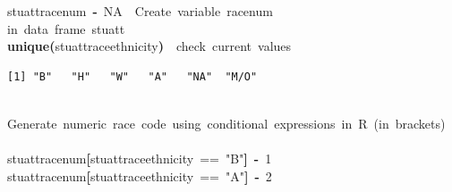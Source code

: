 \documentclass[12pt]{article}
\makeatletter
\newcommand{\hlnumber}[1]{\textcolor[rgb]{0,0,0}{#1}}%
\newcommand{\hlfunctioncall}[1]{\textcolor[rgb]{0.501960784313725,0,0.329411764705882}{\textbf{#1}}}%
\newcommand{\hlstring}[1]{\textcolor[rgb]{0.6,0.6,1}{#1}}%
\newcommand{\hlkeyword}[1]{\textcolor[rgb]{0,0,0}{\textbf{#1}}}%
\newcommand{\hlcomment}[1]{\textcolor[rgb]{0.180392156862745,0.6,0.341176470588235}{#1}}%
\newcommand{\hlassignement}[1]{\textcolor[rgb]{0,0,0}{\textbf{#1}}}%
\newcommand{\hlsymbol}[1]{\textcolor[rgb]{0,0,0}{#1}}%
\newcommand{\hlstd}[1]{\textcolor[rgb]{0,0,0}{#1}}%
\newenvironment{kframe}{%
 \def\FrameCommand##1{\hskip\@totalleftmargin \hskip-\fboxsep
 \colorbox{shadecolor}{##1}\hskip-\fboxsep
     \hskip-\linewidth \hskip-\@totalleftmargin \hskip\columnwidth}%
 \MakeFramed {\advance\hsize-\width
   \@totalleftmargin\z@ \linewidth\hsize
   \@setminipage}}%
 {\par\unskip\endMakeFramed}
\newenvironment{knitrout}{}{} %
\makeatother
\begin{document}
\begin{knitrout}
\color{fgcolor}\begin{kframe}
\begin{flushleft}
\ttfamily\noindent
\hlsymbol{stuatt}\hlkeyword{\usebox{\hlnormalsizeboxdollar}}\hlsymbol{race\usebox{\hlnormalsizeboxunderscore}num}{\ }\hlassignement{\usebox{\hlnormalsizeboxlessthan}-}{\ }\hlnumber{NA}{\ }{\ }\hlcomment{\usebox{\hlnormalsizeboxhash}{\ }Create{\ }variable{\ }race\usebox{\hlnormalsizeboxunderscore}num}\hspace*{\fill}\\
\hlstd{}\hlcomment{\usebox{\hlnormalsizeboxhash}{\ }in{\ }data{\ }frame{\ }stuatt}\hspace*{\fill}\\
\hlstd{}\hlfunctioncall{unique}\hlkeyword{(}\hlsymbol{stuatt}\hlkeyword{\usebox{\hlnormalsizeboxdollar}}\hlsymbol{race\usebox{\hlnormalsizeboxunderscore}ethnicity}\hlkeyword{)}{\ }{\ }\hlcomment{\usebox{\hlnormalsizeboxhash}check{\ }current{\ }values}\mbox{}
\normalfont
\end{flushleft}
\begin{verbatim}
[1] "B"   "H"   "W"   "A"   "NA"  "M/O"
\end{verbatim}
\begin{flushleft}
\ttfamily\noindent
\hspace*{\fill}\\
\hlstd{}\hlcomment{\usebox{\hlnormalsizeboxhash}{\ }Generate{\ }numeric{\ }race{\ }code{\ }using{\ }conditional{\ }expressions{\ }in{\ }R{\ }(in{\ }brackets)}\hspace*{\fill}\\
\hlstd{}\hspace*{\fill}\\
\hlstd{}\hlsymbol{stuatt}\hlkeyword{\usebox{\hlnormalsizeboxdollar}}\hlsymbol{race\usebox{\hlnormalsizeboxunderscore}num}\hlkeyword{[}\hlsymbol{stuatt}\hlkeyword{\usebox{\hlnormalsizeboxdollar}}\hlsymbol{race\usebox{\hlnormalsizeboxunderscore}ethnicity}{\ }=={\ }\hlstring{"{}B"{}}\hlkeyword{]}{\ }\hlassignement{\usebox{\hlnormalsizeboxlessthan}-}{\ }\hlnumber{1}\hspace*{\fill}\\
\hlstd{}\hlsymbol{stuatt}\hlkeyword{\usebox{\hlnormalsizeboxdollar}}\hlsymbol{race\usebox{\hlnormalsizeboxunderscore}num}\hlkeyword{[}\hlsymbol{stuatt}\hlkeyword{\usebox{\hlnormalsizeboxdollar}}\hlsymbol{race\usebox{\hlnormalsizeboxunderscore}ethnicity}{\ }=={\ }\hlstring{"{}A"{}}\hlkeyword{]}{\ }\hlassignement{\usebox{\hlnormalsizeboxlessthan}-}{\ }\hlnumber{2}\hspace*{\fill}\\

\end{flushleft}
\end{kframe}
\end{knitrout}
\end{document}
